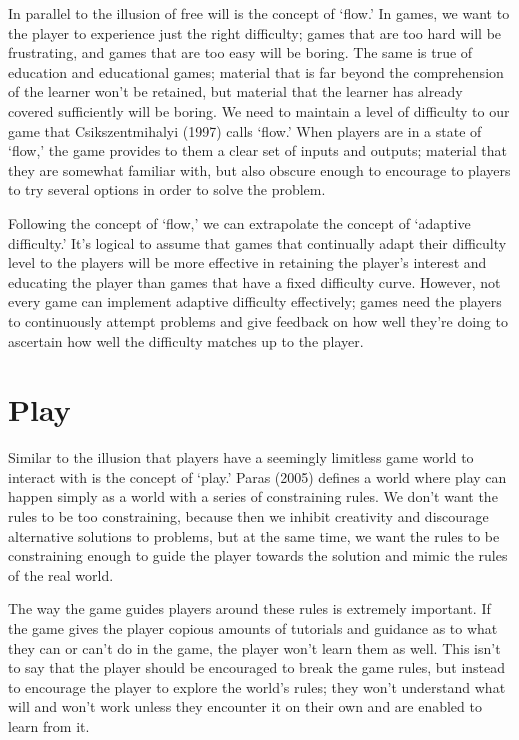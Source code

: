 \documentclass[12pt]{report}
\begin{document}
		In parallel to the illusion of free will is the concept of ‘flow.' In games, we want to the player to experience just the right difficulty; games that are too hard will be frustrating, and games that are too easy will be boring. The same is true of education and educational games; material that is far beyond the comprehension of the learner won't be retained, but material that the learner has already covered sufficiently will be boring. We need to maintain a level of difficulty to our game that Csikszentmihalyi (1997) calls ‘flow.' When players are in a state of ‘flow,' the game provides to them a clear set of inputs and outputs; material that they are somewhat familiar with, but also obscure enough to encourage to players to try several options in order to solve the problem.

		Following the concept of ‘flow,' we can extrapolate the concept of ‘adaptive difficulty.' It's logical to assume that games that continually adapt their difficulty level to the players will be more effective in retaining the player's interest and educating the player than games that have a fixed difficulty curve. However, not every game can implement adaptive difficulty effectively; games need the players to continuously attempt problems and give feedback on how well they're doing to ascertain how well the difficulty matches up to the player.

	\section{Play}

		Similar to the illusion that players have a seemingly limitless game world to interact with is the concept of ‘play.' Paras (2005) defines a world where play can happen simply as a world with a series of constraining rules. We don't want the rules to be too constraining, because then we inhibit creativity and discourage alternative solutions to problems, but at the same time, we want the rules to be constraining enough to guide the player towards the solution and mimic the rules of the real world.
		
		The way the game guides players around these rules is extremely important. If the game gives the player copious amounts of tutorials and guidance as to what they can or can't do in the game, the player won't learn them as well. This isn't to say that the player should be encouraged to break the game rules, but instead to encourage the player to explore the world's rules; they won't understand what will and won't work unless they encounter it on their own and are enabled to learn from it.
	
\end{document}
